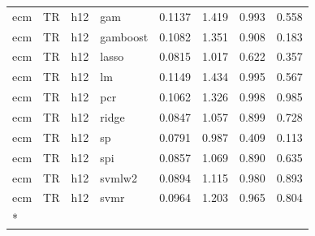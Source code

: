 \begin{ThreePartTable}
\begin{longtable}[t]{llclcccc}
ecm & TR & h12 & gam & 0.1137 & 1.419 & 0.993 & 0.558\\
ecm & TR & h12 & gamboost & 0.1082 & 1.351 & 0.908 & 0.183\\
ecm & TR & h12 & lasso & 0.0815 & 1.017 & 0.622 & 0.357\\
ecm & TR & h12 & lm & 0.1149 & 1.434 & 0.995 & 0.567\\
ecm & TR & h12 & pcr & 0.1062 & 1.326 & 0.998 & 0.985\\
ecm & TR & h12 & ridge & 0.0847 & 1.057 & 0.899 & 0.728\\
ecm & TR & h12 & sp & 0.0791 & 0.987 & 0.409 & 0.113\\
ecm & TR & h12 & spi & 0.0857 & 1.069 & 0.890 & 0.635\\
ecm & TR & h12 & svmlw2 & 0.0894 & 1.115 & 0.980 & 0.893\\
ecm & TR & h12 & svmr & 0.0964 & 1.203 & 0.965 & 0.804\\*
\end{longtable}
\end{ThreePartTable}
\endgroup{}
